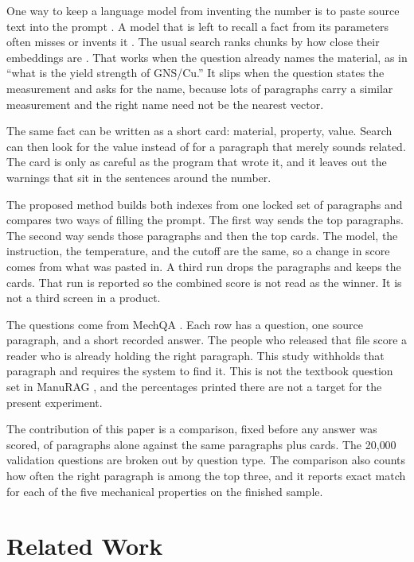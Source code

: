 \documentclass[conference]{IEEEtran}
\begin{document}
One way to keep a language model from inventing the number is to paste source text into the prompt \cite{lewis2020rag,guu2020realm,izacard2021fid,gao2023ragsurvey}. A model that is left to recall a fact from its parameters often misses or invents it \cite{petroni2019lama,ji2023hallucination,shuster2021hallucination}. The usual search ranks chunks by how close their embeddings are \cite{vaswani2017attention,devlin2019bert,reimers2019sbert,karpukhin2020dpr}. That works when the question already names the material, as in ``what is the yield strength of GNS/Cu.'' It slips when the question states the measurement and asks for the name, because lots of paragraphs carry a similar measurement and the right name need not be the nearest vector.

The same fact can be written as a short card: material, property, value. Search can then look for the value instead of for a paragraph that merely sounds related. The card is only as careful as the program that wrote it, and it leaves out the warnings that sit in the sentences around the number.

The proposed method builds both indexes from one locked set of paragraphs and compares two ways of filling the prompt. The first way sends the top paragraphs. The second way sends those paragraphs and then the top cards. The model, the instruction, the temperature, and the cutoff are the same, so a change in score comes from what was pasted in. A third run drops the paragraphs and keeps the cards. That run is reported so the combined score is not read as the winner. It is not a third screen in a product.

The questions come from MechQA \cite{zhang2026mechqa}. Each row has a question, one source paragraph, and a short recorded answer. The people who released that file score a reader who is already holding the right paragraph. This study withholds that paragraph and requires the system to find it. This is not the textbook question set in ManuRAG \cite{li2026manurag}, and the percentages printed there are not a target for the present experiment.

The contribution of this paper is a comparison, fixed before any answer was scored, of paragraphs alone against the same paragraphs plus cards. The 20{,}000 validation questions are broken out by question type. The comparison also counts how often the right paragraph is among the top three, and it reports exact match for each of the five mechanical properties on the finished sample.

\section{Related Work}
\end{document}
